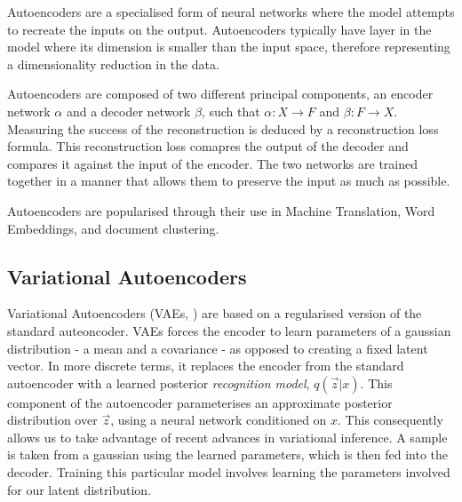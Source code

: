 \documentclass[12pt,twoside]{report}
\begin{document}
Autoencoders are a specialised form of neural networks where the model attempts to recreate the inputs on the output. Autoencoders typically have  layer in the model where its dimension is smaller than the input space, therefore representing a dimensionality reduction in the data. 

Autoencoders are composed of two different principal components, an encoder network $\alpha$ and a decoder network $\beta$, such that $\alpha : X \rightarrow F$ and $\beta : F \rightarrow X$. Measuring the success of the reconstruction is deduced by a reconstruction loss formula. This reconstruction loss comapres the output of the decoder and compares it against the input of the encoder. The two networks are trained together in a manner that allows them to preserve the input as much as possible.


Autoencoders are popularised through their use in Machine Translation, Word Embeddings, and document clustering. 

\subsection{Variational Autoencoders}

Variational Autoencoders (VAEs, \cite{kingma_auto-encoding_2013}) are based on a regularised version of the standard auteoncoder. VAEs forces the encoder to learn parameters of a gaussian distribution - a mean and a covariance - as opposed to creating a fixed latent vector. In more discrete terms, it replaces the encoder from the standard autoencoder with a learned posterior \textit{recognition model}, $q(\overrightarrow{z}|x)$. This component of the autoencoder parameterises an approximate posterior distribution over $\overrightarrow{z}$, using a neural network conditioned on $x$. This consequently allows us to take advantage of recent advances in variational inference.  A sample is taken from a gaussian using the learned parameters, which is then fed into the decoder. Training this particular model involves learning the parameters involved for our latent distribution.
\end{document}

